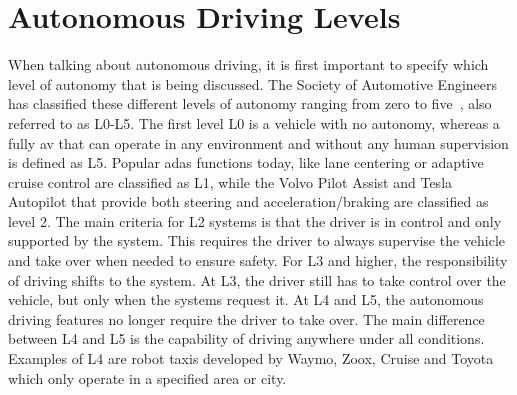 
\section{Autonomous Driving Levels}
\label{sec:intro_ad}
When talking about autonomous driving, it is first important to specify which level of autonomy that is being discussed. The Society of Automotive Engineers has classified these different levels of autonomy ranging from zero to five~\cite{SAE2021}, also referred to as L0-L5. The first level L0 is a vehicle with no autonomy, whereas a fully \gls{av} that can operate in any environment and without any human supervision is defined as L5. Popular \gls{adas} functions today, like lane centering or adaptive cruise control are classified as L1, while the Volvo Pilot Assist and Tesla Autopilot that provide both steering and acceleration/braking are classified as level 2. The main criteria for L2 systems is that the driver is in control and only supported by the system. 
This requires the driver to always supervise the vehicle and take over when needed to ensure safety. For L3 and higher, the responsibility of driving shifts to the system. At L3, the driver still has to take control over the vehicle, but only when the systems request it. At L4 and L5, the autonomous driving features no longer require the driver to take over. The main difference between L4 and L5 is the capability of driving anywhere under all conditions. Examples of L4 are robot taxis developed by Waymo, Zoox, Cruise and Toyota which only operate in a specified area or city. 

